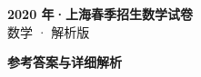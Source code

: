 \documentclass[zihao=-4, a4paper]{ctexart}
\begin{document}
\begin{center}
  {\Large\bfseries 2020 年·上海春季招生数学试卷}\\[4pt]
  {\large 数学 · 解析版}
\end{center}
\medskip
{}

\clearpage
{}
\begin{center}{\Large\bfseries 参考答案与详细解析}\end{center}
\medskip

\end{document}
